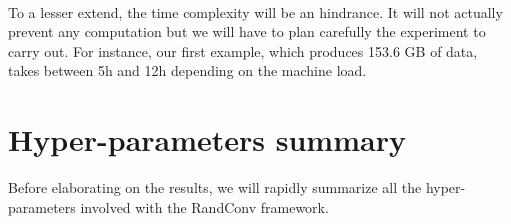 \documentclass[a4paper]{report}
\begin{document}
		\paragraph{}
		To a lesser extend, the time complexity will be an hindrance. It will not actually prevent any computation but we will have to plan carefully the experiment to carry out. For instance, our first example, which produces 153.6 GB of data, takes between 5h and 12h depending on the machine load.
		
	\section{Hyper-parameters summary}
	Before elaborating on the results, we will rapidly summarize all the hyper-parameters involved with the RandConv framework.
	
\end{document}
